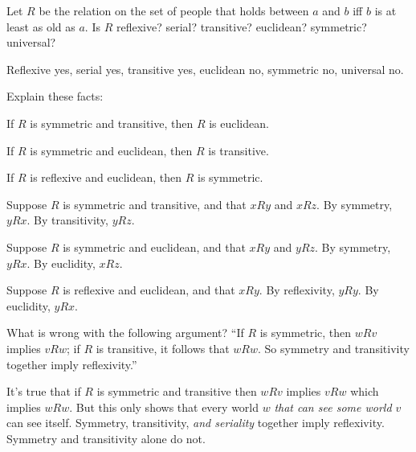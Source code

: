 \begin{exercise}
  Let $R$ be the relation on the set of people that holds between $a$ and $b$
  iff $b$ is at least as old as $a$. Is $R$ reflexive? serial? transitive?
  euclidean? symmetric? universal?
\end{exercise}
\begin{solution}
  Reflexive yes, serial yes, transitive yes, euclidean no, symmetric no,
  universal no.
\end{solution}

\begin{exercise}\label{ex:relations}
  Explain these facts:
  \begin{exlist}
  \item If $R$ is symmetric and transitive, then $R$ is euclidean.
  \item If $R$ is symmetric and euclidean, then $R$ is transitive.
  \item If $R$ is reflexive and euclidean, then $R$ is symmetric.
  \end{exlist}
\end{exercise}
\begin{solution}
  \begin{sollist}
    \item Suppose $R$ is symmetric and transitive, and that $xRy$ and $xRz$. By
    symmetry, $yRx$. By transitivity, $yRz$.
    \item Suppose $R$ is symmetric and euclidean, and that $xRy$ and $yRz$. By
    symmetry, $yRx$. By euclidity, $xRz$.
    \item Suppose $R$ is reflexive and euclidean, and that $xRy$. By
    reflexivity, $yRy$. By euclidity, $yRx$.
  \end{sollist}
\end{solution}

\begin{exercise}
  What is wrong with the following argument? ``If $R$ is symmetric,
  then $wRv$ implies $vRw$; if $R$ is transitive, it follows that
  $wRw$. So symmetry and transitivity together imply reflexivity.''
\end{exercise}
\begin{solution}
  It's true that if $R$ is symmetric and transitive then $wRv$ implies $vRw$
  which implies $wRw$. But this only shows that every world $w$ \emph{that can
    see some world $v$} can see itself. Symmetry, transitivity, \emph{and
    seriality} together imply reflexivity. Symmetry and transitivity alone do
  not.
\end{solution}

